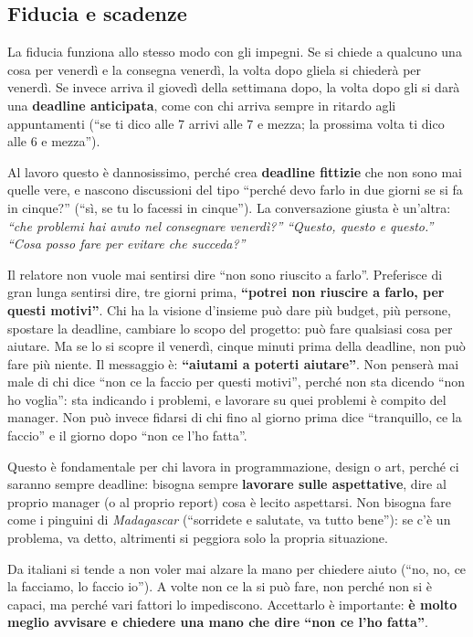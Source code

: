 \subsection{Fiducia e scadenze}

La fiducia funziona allo stesso modo con gli impegni. Se si chiede a qualcuno
una cosa per venerdì e la consegna venerdì, la volta dopo gliela si chiederà
per venerdì. Se invece arriva il giovedì della settimana dopo, la volta dopo
gli si darà una \textbf{deadline anticipata}, come con chi arriva sempre in
ritardo agli appuntamenti (``se ti dico alle 7 arrivi alle 7 e mezza; la
prossima volta ti dico alle 6 e mezza'').

Al lavoro questo è dannosissimo, perché crea \textbf{deadline fittizie} che
non sono mai quelle vere, e nascono discussioni del tipo ``perché devo farlo
in due giorni se si fa in cinque?'' (``sì, se tu lo facessi in cinque''). La
conversazione giusta è un'altra: \emph{``che problemi hai avuto nel
consegnare venerdì?'' ``Questo, questo e questo.'' ``Cosa posso fare per
evitare che succeda?''}

Il relatore non vuole mai sentirsi dire ``non sono riuscito a farlo''.
Preferisce di gran lunga sentirsi dire, tre giorni prima, \textbf{``potrei non
riuscire a farlo, per questi motivi''}. Chi ha la visione d'insieme può dare
più budget, più persone, spostare la deadline, cambiare lo scopo del progetto:
può fare qualsiasi cosa per aiutare. Ma se lo si scopre il venerdì, cinque
minuti prima della deadline, non può fare più niente. Il messaggio è:
\textbf{``aiutami a poterti aiutare''}. Non penserà mai male di chi dice ``non
ce la faccio per questi motivi'', perché non sta dicendo ``non ho voglia'': sta
indicando i problemi, e lavorare su quei problemi è compito del manager. Non
può invece fidarsi di chi fino al giorno prima dice ``tranquillo, ce la
faccio'' e il giorno dopo ``non ce l'ho fatta''.

Questo è fondamentale per chi lavora in programmazione, design o art, perché
ci saranno sempre deadline: bisogna sempre \textbf{lavorare sulle aspettative},
dire al proprio manager (o al proprio report) cosa è lecito aspettarsi. Non
bisogna fare come i pinguini di \emph{Madagascar} (``sorridete e salutate, va
tutto bene''): se c'è un problema, va detto, altrimenti si peggiora solo la
propria situazione.

Da italiani si tende a non voler mai alzare la mano per chiedere aiuto
(``no, no, ce la facciamo, lo faccio io''). A volte non ce la si può fare, non
perché non si è capaci, ma perché vari fattori lo impediscono. Accettarlo è
importante: \textbf{è molto meglio avvisare e chiedere una mano che dire
``non ce l'ho fatta''}.

